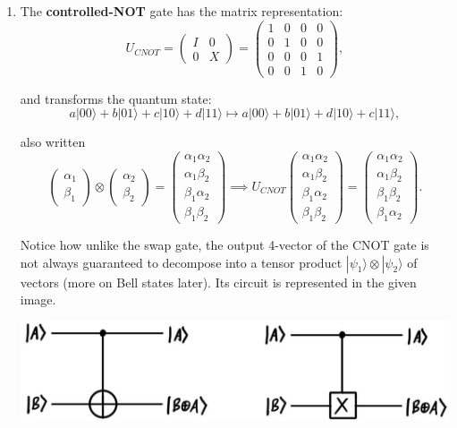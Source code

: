 \documentclass{article}
\theoremstyle{definition}
\begin{document}
    \begin{enumerate}
      \item The \textbf{controlled-NOT} gate has the matrix representation:
        \[U_{CNOT} = \begin{pmatrix} I & 0 \\ 0 & X \end{pmatrix} = \begin{pmatrix} 1&0&0&0\\0&1&0&0\\0&0&0&1\\0&0&1&0 \end{pmatrix},\]

      and transforms the quantum state:
        \[a |00\rangle + b |01\rangle + c|10\rangle + d|11\rangle \mapsto a |00\rangle + b |01\rangle + d|10\rangle + c|11\rangle,\]

      also written
        \[\begin{pmatrix} \alpha_1 \\ \beta_1 \end{pmatrix} \otimes \begin{pmatrix} \alpha_2 \\ \beta_2 \end{pmatrix} = \begin{pmatrix} \alpha_1 \alpha_2 \\ \alpha_1 \beta_2 \\ \beta_1 \alpha_2 \\ \beta_1 \beta_2 \end{pmatrix} \implies U_{CNOT} \begin{pmatrix} \alpha_1 \alpha_2 \\ \alpha_1 \beta_2 \\ \beta_1 \alpha_2 \\ \beta_1 \beta_2 \end{pmatrix} = \begin{pmatrix} \alpha_1 \alpha_2 \\ \alpha_1 \beta_2 \\ \beta_1 \beta_2 \\ \beta_1 \alpha_2 \end{pmatrix}.\]

      Notice how unlike the swap gate, the output 4-vector of the CNOT gate is not always guaranteed to decompose into a tensor product $|\psi_1 \rangle \otimes |\psi_2 \rangle$ of vectors (more on Bell states later). Its circuit is represented in the given image.

      \begin{center}
        \includegraphics[scale=0.3]{img/Control_Not_gate.jpg}
      \end{center}


\end{enumerate}
\end{document}
